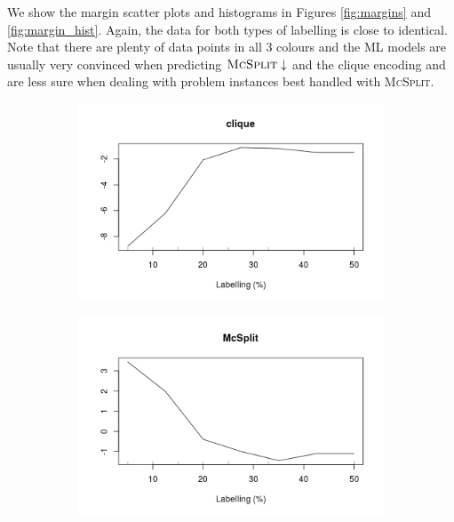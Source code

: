 \documentclass{l4proj}
\theoremstyle{definition}
\theoremstyle{remark}
\begin{document}
We show the margin scatter plots and histograms in Figures
\ref{fig:margins} and \ref{fig:margin_hist}. Again, the data for both types of
labelling is close to identical. Note that there are plenty of data points in
all 3 colours and the ML models are usually very convinced when predicting
$\textsc{McSplit}\downarrow$ and the clique encoding and are less sure when
dealing with problem instances best handled with \textsc{McSplit}.

\begin{figure}
  \centering
  \begin{subfigure}[t]{0.49\textwidth}
    \centering
    \includegraphics[width=\textwidth]{images/_both_labels_clique_labelling_.png}
  \end{subfigure}
  \begin{subfigure}[t]{0.49\textwidth}
    \centering
    \includegraphics[width=\textwidth]{images/_both_labels_mcsplit_labelling_.png}
  \end{subfigure}

\end{figure}
\end{document}
